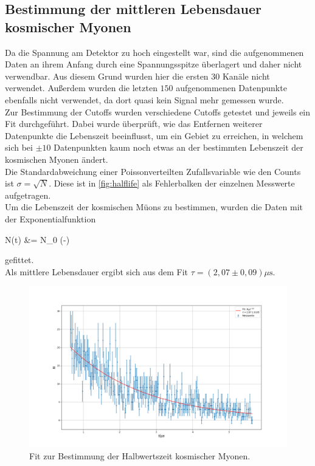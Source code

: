 \subsection{Bestimmung der mittleren Lebensdauer kosmischer Myonen}
Da die Spannung am Detektor zu hoch eingestellt war, sind die aufgenommenen Daten an ihrem Anfang durch eine Spannungsspitze überlagert und daher nicht verwendbar. Aus diesem Grund wurden hier die ersten $30$ Kanäle nicht verwendet. Außerdem wurden die letzten $150$ aufgenommenen Datenpunkte ebenfalls nicht verwendet, da dort quasi kein Signal mehr gemessen wurde.\\
Zur Bestimmung der Cutoffs wurden verschiedene Cutoffs getestet und jeweils ein Fit durchgeführt. Dabei wurde überprüft, wie das Entfernen weiterer Datenpunkte die Lebenszeit beeinflusst, um ein Gebiet zu erreichen, in welchem sich bei $\pm 10$ Datenpunkten kaum noch etwas an der bestimmten Lebenszeit der kosmischen Myonen ändert.\\
Die Standardabweichung einer Poissonverteilten Zufallsvariable wie den Counts ist $ \sigma = \sqrt{N}$. Diese ist in \autoref{fig:halflife} als Fehlerbalken der einzelnen Messwerte aufgetragen.\\
Um die Lebenszeit der kosmischen Müons zu bestimmen, wurden die Daten mit der Exponentialfunktion 
\begin{aquation}
    N\left(t\right) &= N_0 \exp\left(-\right)
\end{aquation}
gefittet.\\
Als mittlere Lebensdauer ergibt sich aus dem Fit $\tau = (2,07 \pm 0,09)\text{$\mu$s}$.


\begin{figure}
    \centering
    \includegraphics[width=\linewidth]{figures/halflife_fit.png}
    \caption{Fit zur Bestimmung der Halbwertszeit kosmischer Myonen.}
    \label{fig:halflife}
\end{figure}


